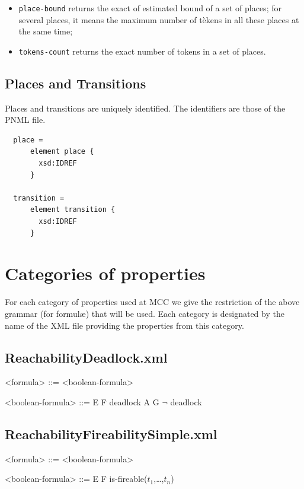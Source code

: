 \documentclass[10pt,english,a4paper]{article}
\begin{document}
\begin{itemize}
  \item \lstinline!place-bound! returns the exact of estimated bound of a set of places;
    for several places, it means the maximum number of tèkens in all these places at the same
    time;
  \item \lstinline!tokens-count! returns the exact number of tokens in a set of places.
\end{itemize}

\subsection{Places and Transitions}

Places and transitions are uniquely identified. The identifiers are those of the PNML file.

\begin{lstlisting}
  place =
      element place {
        xsd:IDREF
      }

  transition =
      element transition {
        xsd:IDREF
      }
\end{lstlisting}


\section{Categories of properties}

For each category of properties used at MCC we give the restriction of the above grammar (for formulæ) that will be used.
Each category is designated by the name of the XML file providing the properties from this category.

\subsection{ReachabilityDeadlock.xml}

\begin{grammar}

<formula> ::= <boolean-formula>

<boolean-formula> ::= E F deadlock 
\alt A G $\lnot$ deadlock

\end{grammar}

\subsection{ReachabilityFireabilitySimple.xml}

\begin{grammar}

<formula> ::= <boolean-formula> 

<boolean-formula> ::= E F is-fireable($t_1$,\dots,$t_n$)

\end{grammar}
\end{document}
